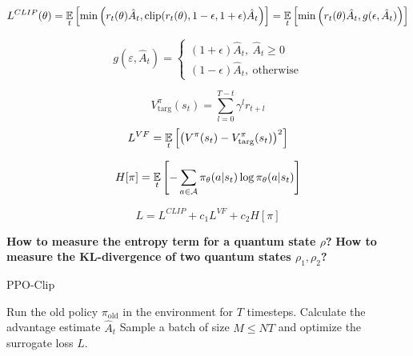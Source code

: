 \documentclass[12pt, a4paper]{article}
\begin{document}
\begin{equation}
L^{CLIP}(\theta) = \underset{t}{\LARGE{\mathbb E}}\left[\min\left(r_t(\theta)\hat A_t, \textrm{clip}(r_t(\theta),1-\epsilon,1+\epsilon)\hat A_t\right)\right]
= \underset{t}{\LARGE{\mathbb E}} \left[
    \min\left( r_t(\theta)\hat A_t, g(\epsilon,\hat A_t)
    \right)
\right]
\end{equation}

\begin{equation}
g(\varepsilon, \hat A_t) = \begin{cases}
(1+\epsilon) \hat A_t, ~\hat A_t \geq 0 \\
(1-\epsilon) \hat A_t, ~\textrm{otherwise}
\end{cases}
\end{equation}

\begin{equation}
V_{\textrm{targ}}^{\pi}(s_t) = \sum\limits_{l=0}^{T-t} \gamma^lr_{t+l}
\end{equation}
\begin{equation}
L^{VF} = \underset{t}{\LARGE{\mathbb E}} \left[\left(V^{\pi}(s_t) - V_{\textrm{targ}}^{\pi}(s_t)\right)^2\right]
\end{equation}





\begin{equation}
H[\pi] = \underset{t}{\LARGE{\mathbb E}}\left[
-\sum\limits_{a\in \mathcal A}\pi_{\theta}(a|s_t)\log\pi_{\theta}(a|s_t)
\right]
\end{equation}

\begin{equation}
L = L^{CLIP} + c_1L^{VF} + c_2 H[\pi]
\end{equation}

\textbf{How to measure the entropy term for a quantum state $\rho$?}
\textbf{How to measure the KL-divergence of two quantum states $\rho_1,\rho_2$?}
\begin{algorithm}[H]
    \caption{PPO-Clip}
    \begin{algorithmic}[1]
                \State Run the old policy $\pi_{\textrm{old}}$ in the environment for $T$ timesteps.
                    \State Calculate the advantage estimate $\hat A_t$
                \EndFor
            \EndFor
                \State Sample a batch of size $M\leq NT$ and optimize the surrogate loss $L$.
            \EndFor
        \EndFor
    \EndProcedure
    \end{algorithmic}
\end{algorithm}
\end{document}
